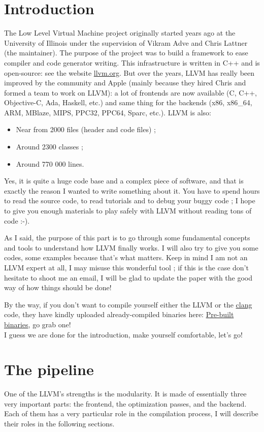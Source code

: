 \documentclass[a4paper, 11pt, notitlepage]{report}
\begin{document}
\section{Introduction}
The Low Level Virtual Machine project originally started years ago at the University of Illinois under the supervision of Vikram Adve and Chris Lattner (the maintainer). The purpose of the project was to build a framework to ease compiler and code generator writing. This infrastructure is written in C++ and is open-source: see the website \href{http://llvm.org/}{llvm.org}. But over the years, LLVM has really been improved by the community and Apple (mainly because they hired Chris and formed a team to work on LLVM): a lot of frontends are now available (C, C++, Objective-C, Ada, Haskell, etc.) and same thing for the backends (x86, x86\_64, ARM, MBlaze, MIPS, PPC32, PPC64, Sparc, etc.). LLVM is also:
\begin{itemize}
	\item Near from 2000 files (header and code files) ;
	\item Around 2300 classes ;
	\item Around 770 000  lines.
\end{itemize}
Yes, it is quite a huge code base and a complex piece of software, and that is exactly the reason I wanted to write something about it. You have to spend hours to read the source code, to read tutorials and to debug your buggy code ; I hope to give you enough materials to play safely with LLVM without reading tons of code :-).

As I said, the purpose of this part is to go through some fundamental concepts and tools to understand how LLVM finally works. I will also try to give you some codes, some examples because that's what matters. Keep in mind I am not an LLVM expert  at all, I may misuse this wonderful tool ; if this is the case don't hesitate to shoot me an email, I will be glad to update the paper with the good way of how things should be done!

By the way, if you don't want to compile yourself either the LLVM or the \href{http://clang.llvm.org/}{clang} code, they have kindly uploaded already-compiled binaries here: \href{http://llvm.org/releases/download.html#3.3}{Pre-built binaries}, go grab one!\\
I guess we are done for the introduction, make yourself comfortable, let's go! 

\section{The pipeline}
One of the LLVM's strengths is the modularity. It is made of essentially three very important parts: the frontend, the optimization passes, and the backend. Each of them has a very particular role in the compilation process, I will describe their roles in the following sections.
\end{document}
